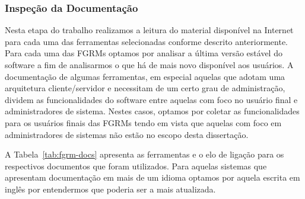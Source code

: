\subsubsection{Inspeção da Documentação}
\label{subsec:inspecao_doumentacao}

Nesta etapa do trabalho realizamos a leitura do material disponível na Internet
para cada uma das ferramentas selecionadas conforme descrito anteriormente.
Para cada uma das FGRMs optamos por analisar a última versão estável do software
a fim de analisarmos o que há de mais novo disponível aos usuários. A
documentação de algumas ferramentas, em especial aquelas que adotam uma
arquitetura cliente/servidor e necessitam de um certo grau de administração,
dividem as funcionalidades do software entre aquelas com foco no usuário final e
ad\-mi\-nis\-tra\-do\-res de sistema. Nestes casos, optamos por coletar as
funcionalidades para os usuários finais das FGRMs tendo em vista que aquelas com
foco em administradores de sistemas não estão no escopo desta dissertação.

A Tabela~\ref{tab:fgrm-docs} apresenta as ferramentas e o elo de ligação para os
respectivos documentos que foram utilizados. Para aquelas sistemas que
apresentam documentação em mais de um i\-di\-o\-ma optamos por aquela escrita em
inglês por entendermos que poderia ser a mais atualizada.

